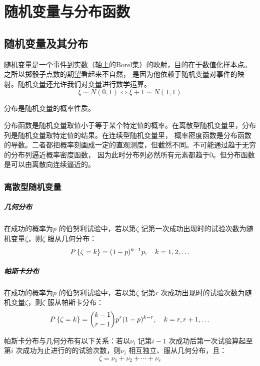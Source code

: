 \chapter{随机变量与分布函数}
\section{随机变量及其分布
}
随机变量是一个事件到实数（轴上的Borel集）的映射，目的在于数值化样本点。之所以掷骰子点数的期望看起来不自然，
是因为他依赖于随机变量对事件的映射。随机变量还允许我们对变量进行数学运算。\[
    \xi \sim N(0,1) \iff \xi+1 \sim N(1,1)
\]

分布是随机变量的概率性质。

分布函数是随机变量取值小于等于某个特定值的概率。在离散型随机变量里，分布列是随机变量取特定值的结果。在连续型随机变量里，
概率密度函数是分布函数的导数。二者都把概率刻画成一定的直观测度，但截然不同。不可能通过趋于无穷的分布列逼近概率密度函数，
因为此时分布列必然所有元素都趋于0。但分布函数是可以由离散向连续逼近的。


\subsection{离散型随机变量}
\paragraph{几何分布} 在成功的概率为\(p\) 的伯努利试验中，若以第\(\zeta\)
记第一次成功出现时的试验次数为随机变量\(\zeta\)，则\(\zeta\) 服从几何分布：
\[
    \P{\zeta=k} = (1-p)^{k-1} p, \quad k=1,2,\ldots
\]

\paragraph{帕斯卡分布} 在成功的概率为\(p\) 的伯努利试验中，若以第\(\zeta\) 记第\(r\)
次成功出现时的试验次数为随机变量\(\zeta\)，则\(\zeta\) 服从帕斯卡分布：
\[
    \P{\zeta=k} = \binom{k-1}{r-1} p^r
    (1-p)^{k-r}, \quad k=r,r+1,\ldots
\]


帕斯卡分布与几何分布有以下关系：若以\(\nu_{i}\) 记第\(i-1\) 次成功后第一次试验算起至第\(i\)
次成功为止进行的的试验次数，则\(\nu_{i}\) 相互独立、服从几何分布，且：
\[
    \zeta = \nu_{1} + \nu_{2} + \cdots + \nu_{r}
\]

